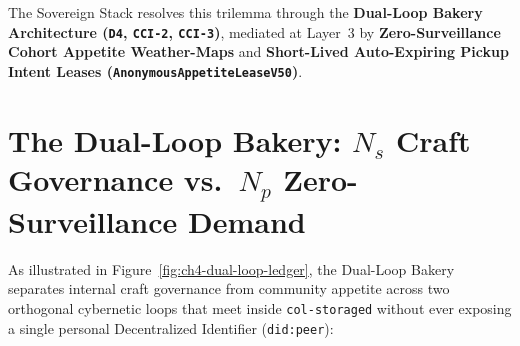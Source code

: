The Sovereign Stack resolves this trilemma through the \textbf{Dual-Loop Bakery Architecture (\texttt{D4}, \texttt{CCI-2}, \texttt{CCI-3})}, mediated at Layer~3 by \textbf{Zero-Surveillance Cohort Appetite Weather-Maps} and \textbf{Short-Lived Auto-Expiring Pickup Intent Leases (\texttt{AnonymousAppetiteLeaseV50})}.

\section{The Dual-Loop Bakery: $N_s$ Craft Governance vs.\ $N_p$ Zero-Surveillance Demand}
\label{sec:ch4-dual-loop-bakery}

As illustrated in Figure~\ref{fig:ch4-dual-loop-ledger}, the Dual-Loop Bakery separates internal craft governance from community appetite across two orthogonal cybernetic loops that meet inside \texttt{col-storaged} without ever exposing a single personal Decentralized Identifier (\texttt{did:peer}):

